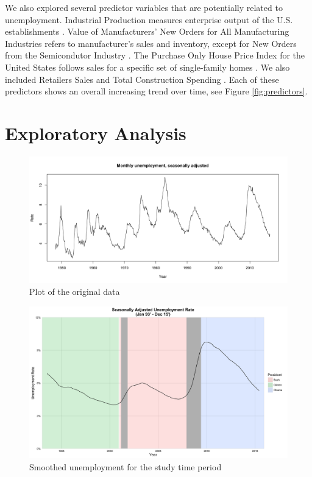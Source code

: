 \documentclass[twoside,twocolumn]{article}
\begin{document}
We also explored several predictor variables that are potentially related to unemployment.  Industrial Production measures enterprise output of the U.S. establishments \citep{BGFS2016}. Value of Manufacturers' New Orders for All Manufacturing Industries refers to manufacturer's sales and inventory, except for New Orders from the Semicondutor Industry \citep{vmno}. The Purchase Only House Price Index for the United States follows sales for a specific set of single-family homes \citep{fhfa2016}. We also included Retailers Sales \citep{retail2016} and Total Construction Spending \citep{construction2016}. Each of these predictors shows an overall increasing trend over time, see Figure \ref{fig:predictors}.

\section{Exploratory Analysis}
		\begin{figure}[htb]
		\centering
		\caption{Plot of the original data}
		\label{fig:unemployment}
		\includegraphics[width=\linewidth]{images/unemployment_total_sa}
	\end{figure}
	
				\begin{figure}[htb]
		\centering
		\caption{Smoothed unemployment for the study time period}
		\label{fig:presunemp}
		\includegraphics[width=\linewidth]{images/presunemp}
		\end{figure}
\end{document}
